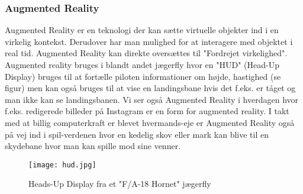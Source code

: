 \subsubsection{Augmented Reality}
Augmented Reality er en teknologi der kan sætte virtuelle objekter ind i en virkelig kontekst. Derudover har man mulighed for at interagere med objektet i real tid.
Augmented Reality kan direkte oversættes til "Fordrejet virkelighed". Augmented reality bruges i blandt andet jægerfly\cite{hud} hvor en "HUD" (Head-Up Display) bruges til at fortælle piloten informationer om højde, hastighed (se figur) men kan også bruges til at vise en landingsbane hvis det f.eks. er tåget og man ikke kan se landingsbanen. 
Vi ser også Augmented Reality i hverdagen hvor f.eks. redigerede billeder på Instagram er en form for augmented reality. I takt med at billig computerkraft er blevet hvermands-eje er Augmented Reality også på vej ind i spil-verdenen hvor en kedelig skov eller mark kan blive til en skydebane hvor man kan spille mod sine venner.

\begin{figure}[H]
    \centering
    \texttt{[image: hud.jpg]}
    \caption{Heads-Up Display fra et "F/A-18 Hornet" jægerfly}
    \label{fig:hud}
\end{figure} 

